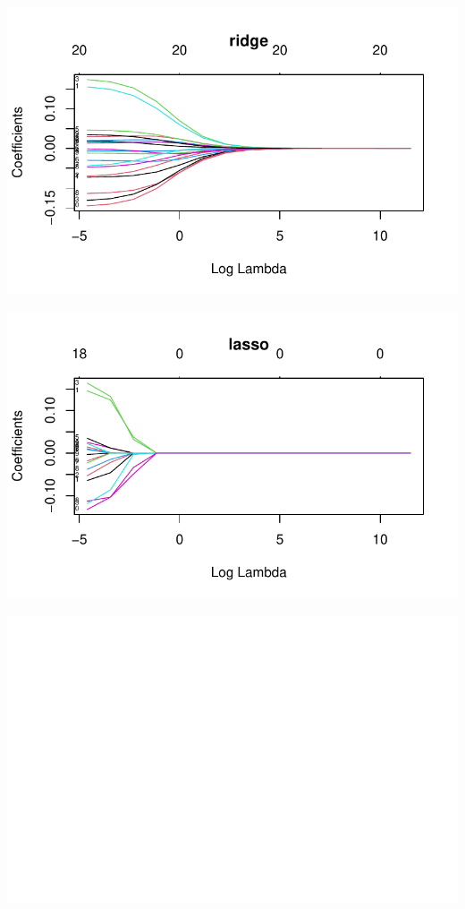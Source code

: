 \documentclass[
  letterpaper,
  DIV=11,
  numbers=noendperiod]{scrartcl}
\begin{document}
\includegraphics{excercise_doc_files/figure-pdf/unnamed-chunk-18-1.pdf}

\includegraphics{excercise_doc_files/figure-pdf/unnamed-chunk-18-2.pdf}

\includegraphics{excercise_doc_files/figure-pdf/unnamed-chunk-18-3.pdf}
\end{document}
